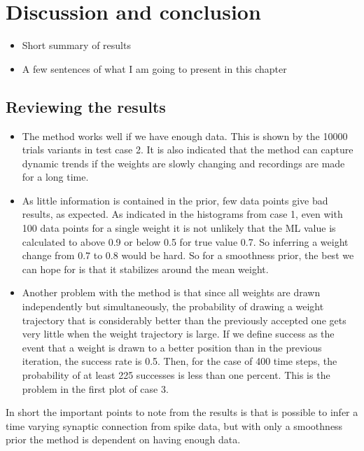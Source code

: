 
\chapter{Discussion and conclusion}

\begin{itemize}
    \item Short summary of results
    \item A few sentences of what I am going to present in this chapter
\end{itemize}

\section{Reviewing the results}

\begin{itemize}
    \item The method works well if we have enough data. This is shown by the 10000 trials variants in test case 2. It is also indicated that the method can capture dynamic trends if the weights are slowly changing and recordings are made for a long time.
    \item As little information is contained in the prior, few data points give bad results, as expected. As indicated in the histograms from case 1, even with 100 data points for a single weight it is not unlikely that the ML value is calculated to above 0.9 or below 0.5 for true value 0.7. So inferring a weight change from 0.7 to 0.8 would be hard. So for a smoothness prior, the best we can hope for is that it stabilizes around the mean weight. 
    \item Another problem with the method is that since all weights are drawn independently but simultaneously, the probability of drawing a weight trajectory that is considerably better than the previously accepted one gets very little when the weight trajectory is large. If we define success as the event that a weight is drawn to a better position than in the previous iteration, the success rate is 0.5. Then, for the case of 400 time steps, the probability of at least 225 successes is less than one percent. This is the problem in the first plot of case 3.  
\end{itemize}
In short the important points to note from the results is that is possible to infer a time varying synaptic connection from spike data, but with only a smoothness prior the method is dependent on having enough data. 




